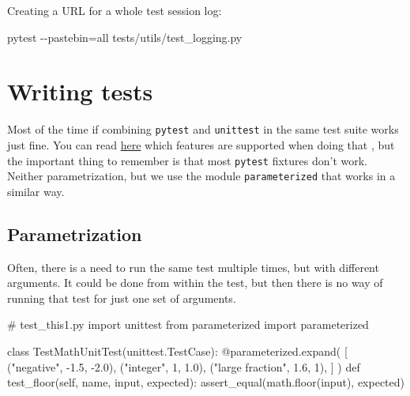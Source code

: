 \documentclass[
]{report}
\newenvironment{Shaded}{\begin{snugshade}}{\end{snugshade}}
\newcommand{\AttributeTok}[1]{\textcolor[rgb]{0.40,0.45,0.13}{#1}}
\newcommand{\BuiltInTok}[1]{\textcolor[rgb]{0.00,0.23,0.31}{#1}}
\newcommand{\CommentTok}[1]{\textcolor[rgb]{0.37,0.37,0.37}{#1}}
\newcommand{\DecValTok}[1]{\textcolor[rgb]{0.68,0.00,0.00}{#1}}
\newcommand{\ExtensionTok}[1]{\textcolor[rgb]{0.00,0.23,0.31}{#1}}
\newcommand{\FloatTok}[1]{\textcolor[rgb]{0.68,0.00,0.00}{#1}}
\newcommand{\ImportTok}[1]{\textcolor[rgb]{0.00,0.46,0.62}{#1}}
\newcommand{\KeywordTok}[1]{\textcolor[rgb]{0.00,0.23,0.31}{#1}}
\newcommand{\NormalTok}[1]{\textcolor[rgb]{0.00,0.23,0.31}{#1}}
\newcommand{\OperatorTok}[1]{\textcolor[rgb]{0.37,0.37,0.37}{#1}}
\newcommand{\StringTok}[1]{\textcolor[rgb]{0.13,0.47,0.30}{#1}}
\newcommand{\VariableTok}[1]{\textcolor[rgb]{0.07,0.07,0.07}{#1}}
\begin{document}
Creating a URL for a whole test session log:

\begin{Shaded}
\begin{Highlighting}[]
\ExtensionTok{pytest} \AttributeTok{{-}{-}pastebin}\OperatorTok{=}\NormalTok{all tests/utils/test\_logging.py}
\end{Highlighting}
\end{Shaded}

\section{Writing tests}\label{writing-tests}

Most of the time if combining \texttt{pytest} and \texttt{unittest} in
the same test suite works just fine. You can read
\href{https://docs.pytest.org/en/stable/unittest.html}{here} which
features are supported when doing that , but the important thing to
remember is that most \texttt{pytest} fixtures don't work. Neither
parametrization, but we use the module \texttt{parameterized} that works
in a similar way.

\subsection{Parametrization}\label{parametrization}

Often, there is a need to run the same test multiple times, but with
different arguments. It could be done from within the test, but then
there is no way of running that test for just one set of arguments.

\begin{Shaded}
\begin{Highlighting}[]
\CommentTok{\# test\_this1.py}
\ImportTok{import}\NormalTok{ unittest}
\ImportTok{from}\NormalTok{ parameterized }\ImportTok{import}\NormalTok{ parameterized}


\KeywordTok{class}\NormalTok{ TestMathUnitTest(unittest.TestCase):}
    \AttributeTok{@parameterized.expand}\NormalTok{(}
\NormalTok{        [}
\NormalTok{            (}\StringTok{"negative"}\NormalTok{, }\OperatorTok{{-}}\FloatTok{1.5}\NormalTok{, }\OperatorTok{{-}}\FloatTok{2.0}\NormalTok{),}
\NormalTok{            (}\StringTok{"integer"}\NormalTok{, }\DecValTok{1}\NormalTok{, }\FloatTok{1.0}\NormalTok{),}
\NormalTok{            (}\StringTok{"large fraction"}\NormalTok{, }\FloatTok{1.6}\NormalTok{, }\DecValTok{1}\NormalTok{),}
\NormalTok{        ]}
\NormalTok{    )}
    \KeywordTok{def}\NormalTok{ test\_floor(}\VariableTok{self}\NormalTok{, name, }\BuiltInTok{input}\NormalTok{, expected):}
\NormalTok{        assert\_equal(math.floor(}\BuiltInTok{input}\NormalTok{), expected)}
\end{Highlighting}
\end{Shaded}
\end{document}
